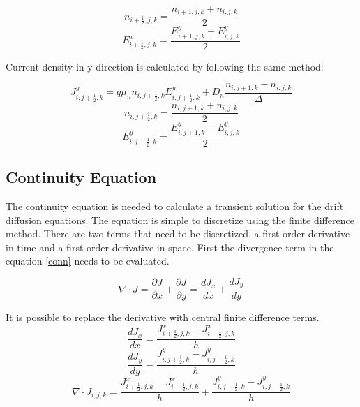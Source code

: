 \begin{doublespace}
\begin{equation}\nonumber
n_{i+\frac{1}{2},j,k}=\frac{n_{i+1,j,k}+n_{i,j,k}}{2}
\end{equation}
\begin{equation}\nonumber
E^{x}_{i+\frac{1}{2},j,k}=\frac{E^y_{i+1,j,k}+E^y_{i,j,k}}{2}
\end{equation}

Current density in y direction is calculated by following the same method:

\begin{equation}
J^y_{i,j+\frac{1}{2},k}=q\mu_n n_{i,j+\frac{1}{2},k} E^y_{i,j+\frac{1}{2},k}+D_n \frac{n_{i,j+1,k}-n_{i,j,k}}{\Delta}
\end{equation}
\begin{equation}\nonumber
n_{i,j+\frac{1}{2},k}=\frac{n_{i,j+1,k}+n_{i,j,k}}{2}
\end{equation}
\begin{equation}\nonumber
E^{y}_{i,j+\frac{1}{2},k}=\frac{E^y_{i,j+1,k}+E^y_{i,j,k}}{2}
\end{equation}


\clearpage
\subsection{Continuity Equation}
The continuity equation is needed to calculate a transient solution for the drift diffusion equations. The equation is simple to discretize using the finite difference method. There are two terms that need to be discretized, a first order derivative in time and a first order derivative in space. First the divergence term in the equation \eqref{conn} needs to be evaluated.

\begin{equation}
\nabla \cdot J=\frac{\partial J}{\partial x}+\frac{\partial J}{\partial y}=\frac{d J_x}{d x}+\frac{d J_y}{d y}
\end{equation}

It is possible to replace the derivative with central finite difference terms.
\begin{equation}
\frac{d J_x}{d x}=\frac{J^x_{i+\frac{1}{2},j,k}-J^x_{i-\frac{1}{2},j,k}}{h}
\end{equation}
\begin{equation}
\frac{d J_y}{d y}=\frac{J^y_{i,j+\frac{1}{2},k}-J^y_{i,j-\frac{1}{2},k}}{h}
\end{equation}
\begin{equation}
\nabla \cdot J_{i,j,k}=\frac{J^x_{i+\frac{1}{2},j,k}-J^x_{i-\frac{1}{2},j,k}}{h}+\frac{J^y_{i,j+\frac{1}{2},k}-J^y_{i,j-\frac{1}{2},k}}{h}
\label{delJ}
\end{equation}


\end{doublespace}

